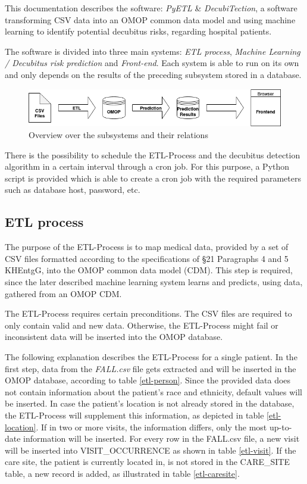 This documentation describes the software: \textit{PyETL} \& \textit{DecubiTection}, a software transforming CSV data into an OMOP common data model and using machine learning to identify potential decubitus risks, regarding hospital patients.

The software is divided into three main systems: \textit{ETL process}, \textit{Machine Learning / Decubitus risk prediction} and \textit{Front-end}. 
Each system is able to run on its own and only depends on the results of the preceding subsystem stored in a database.

\begin{figure}[htbp]
\centerline{\includegraphics[width=1\linewidth]{images/DecubitusPipeline.png}}
\caption{Overview over the subsystems and their relations}
\label{fig:pipeline}
\end{figure}

There is the possibility to schedule the ETL-Process and the decubitus 
detection algorithm in a certain interval through a cron job. 
For this purpose, a Python script is provided which is able to create a cron job with the required parameters such as database host, password, etc.

\subsection{ETL process}
The purpose of the ETL-Process is to map medical data, provided by a set of CSV files formatted according to the specifications of §21 Paragraphs 4 and 5 KHEntgG, into the OMOP common data model (CDM).
This step is required, since the later described machine learning system learns and predicts, using data, gathered from an OMOP CDM. 

The ETL-Process requires certain preconditions. The CSV files are required to only contain valid and new data. Otherwise, the ETL-Process might fail or inconsistent data will be inserted into the OMOP database. 

The following explanation describes the ETL-Process for a single patient. 
In the first step, data from the \textit{FALL.csv} file gets extracted and will be inserted in the OMOP database, according to table \ref{etl-person}.
Since the provided data does not contain information about the patient's race and ethnicity, default values will be inserted. 
In case the patient's location is not already stored in the database, the ETL-Process will supplement this information, as depicted in table \ref{etl-location}.
If in two or more visits, the information differs, only the most up-to-date information will be inserted.
For every row in the FALL.csv file, a new visit will be inserted into VISIT\_OCCURRENCE as shown in table \ref{etl-visit}.
If the care site, the patient is currently located in, is not stored in the CARE\_SITE table, a new record is added, as illustrated in table \ref{etl-caresite}.

